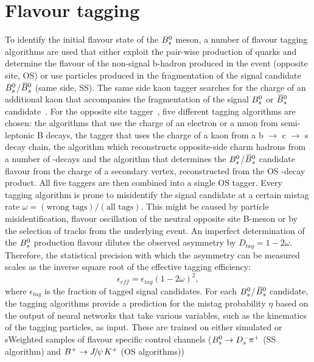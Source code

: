 \section{Flavour tagging}
\label{sec:Tagging}

To identify the initial flavour state of the ${{B}^0_{s}}$ meson,
a number of flavour tagging algorithms are used that either exploit the pair-wise production of \bquark quarks and determine the flavour of the non-signal b-hadron produced in the event (opposite site, OS)
or use particles produced in the fragmentation of the signal candidate ${{B}^0_{s}}$/${{\kern 0.18em\overline{\kern -0.18em B}{}}{}^0_{s}}$ (same side, SS).
The same side kaon tagger searches for the charge of an additional kaon that accompanies the fragmentation of the signal ${{B}^0_{s}}$ or ${{\kern 0.18em\overline{\kern -0.18em B}{}}{}^0_{s}}$ candidate~\cite{Aaij:2016psi}.
For the opposite site tagger~\cite{LHCb-PAPER-2011-027}, five different tagging algorithms are chosen:
the algorithms that use the charge of an electron or a muon from semi-leptonic B decays,
the tagger that uses the charge of a kaon from a b $\to$ c $\to$ s decay chain,
the algorithm which reconstructs opposite-side charm hadrons from a number of \cquark-decays
and the algorithm that determines the ${{B}^0_{s}}$/${{\kern 0.18em\overline{\kern -0.18em B}{}}{}^0_{s}}$ candidate flavour from the charge of a secondary vertex, reconstructed from the OS \bquark-decay product.
All five taggers are then combined into a single OS tagger. \newline
Every tagging algorithm is prone to misidentify the signal candidate at a certain mistag rate $\omega  = (\text{wrong tags})/ (\text{all tags})$. 
This might be caused by particle misidentification, flavour oscillation of the neutral opposite site B-meson or by the selection of tracks from the underlying event.
An imperfect determination of the ${{B}^0_{s}}$ production flavour dilutes the observed \CP asymmetry by $D_{tag} = 1 - 2\omega$.
Therefore, the statistical precision with which the \CP asymmetry can be measured scales as the inverse square root of the effective tagging efficiency:
\begin{equation}
\label{eq: taggingEfficiency}
\epsilon_{eff} = \epsilon_{tag}(1 - 2\omega)^{2},
\end{equation}
where $\epsilon_{tag}$ is the fraction of tagged signal candidates.\newline
For each ${{B}^0_{s}}$/${{\kern 0.18em\overline{\kern -0.18em B}{}}{}^0_{s}}$ candidate, the tagging algorithms provide a prediction for the mistag probability $\eta$ based on the output of neural networks that take various variables, 
such as the kinematics of the tagging particles, as input.
These are trained on either simulated or \textsf{sWeighted} samples of flavour specific control channels (${{B}^0_{s}}\rightarrow{\ensuremath{{D}^-_{s}}}{\ensuremath{{\pi}^+}}$ (SS algorithm) and ${{B}^+}\rightarrow{\ensuremath{{J\mskip -3mu/\mskip -2mu\psi\mskip 2mu}}}{\ensuremath{{K}^+}}$ (OS algorithms))
